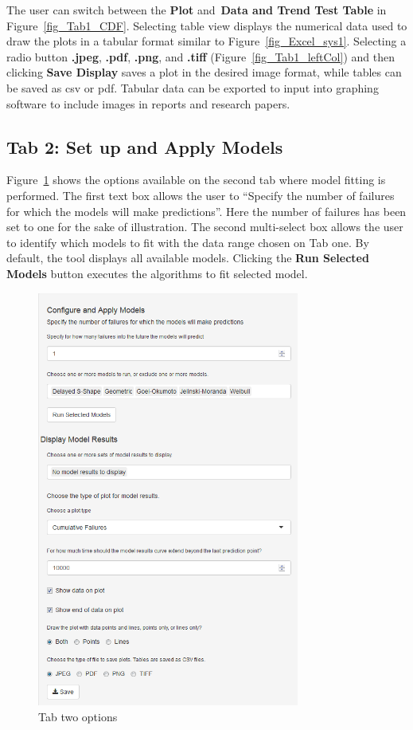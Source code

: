 \documentclass[conference]{IEEEtran}
\begin{document}
The user can switch between the \textbf{Plot} and~\textbf{Data and Trend Test Table} in Figure~\ref{fig_Tab1_CDF}. Selecting table view displays the numerical data used to draw the plots in a tabular format similar to Figure~\ref{fig_Excel_sys1}. Selecting a radio button \textbf{.jpeg}, \textbf{.pdf}, \textbf{.png}, and \textbf{.tiff} (Figure~\ref{fig_Tab1_leftCol}) and then clicking \textbf{Save Display} saves a plot in the desired image format, while tables can be saved as csv or pdf. Tabular data can be exported to input into graphing software to include images in reports and research papers.


\subsection{Tab 2: Set up and Apply Models}\label{tab2}
Figure~\ref{fig_Tab2} shows the options available on the second tab where model fitting is performed. The first text box allows the user to ``Specify the number of failures for which the models will make predictions''. Here the number of failures has been set to one for the sake of illustration. The second multi-select box allows the user to identify which models to fit with the data range chosen on Tab one. By default, the tool displays all available models. Clicking the \textbf{Run Selected Models} button executes the algorithms to fit selected model.

\begin{figure}[!h]
\centering%
\includegraphics[width=3.4in]{Figures/Fig8}
\caption{Tab two options}
\label{fig_Tab2}
\end{figure}
\end{document}
